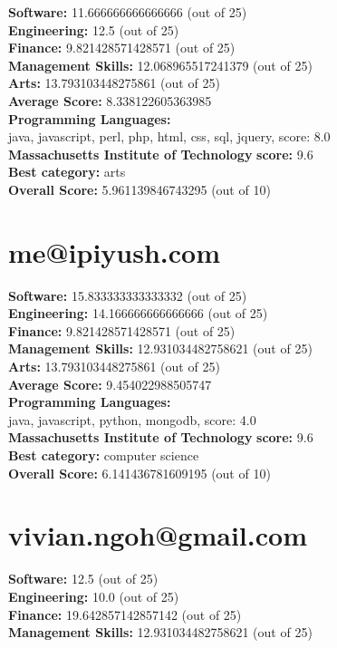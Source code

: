 \documentclass{article}
\begin{document}
\textbf{Software:} 11.666666666666666 (out of 25)\\
\textbf{Engineering: } 12.5 (out of 25)\\
\textbf{Finance:} 9.821428571428571 (out of 25)\\
\textbf{Management Skills:} 12.068965517241379 (out of 25)\\
\textbf{Arts:} 13.793103448275861 (out of 25)\\
\textbf{Average Score: } 8.338122605363985\\
\textbf{Programming Languages:} \\
java, javascript, perl, php, html, css, sql, jquery, score: 8.0\\
\textbf{Massachusetts Institute of Technology} \textbf{score:} 9.6\\
\textbf{Best category: } arts\\
\textbf{Overall Score: }5.961139846743295 (out of 10)\section{me@ipiyush.com}
\textbf{Software:} 15.833333333333332 (out of 25)\\
\textbf{Engineering: } 14.166666666666666 (out of 25)\\
\textbf{Finance:} 9.821428571428571 (out of 25)\\
\textbf{Management Skills:} 12.931034482758621 (out of 25)\\
\textbf{Arts:} 13.793103448275861 (out of 25)\\
\textbf{Average Score: } 9.454022988505747\\
\textbf{Programming Languages:} \\
java, javascript, python, mongodb, score: 4.0\\
\textbf{Massachusetts Institute of Technology} \textbf{score:} 9.6\\
\textbf{Best category: } computer science\\
\textbf{Overall Score: }6.141436781609195 (out of 10)\section{vivian.ngoh@gmail.com}
\textbf{Software:} 12.5 (out of 25)\\
\textbf{Engineering: } 10.0 (out of 25)\\
\textbf{Finance:} 19.642857142857142 (out of 25)\\
\textbf{Management Skills:} 12.931034482758621 (out of 25)\\
\end{document}

